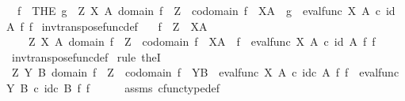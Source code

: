 \begin{isabellebody}
\ \ {\isachardoublequoteopen}f\isactrlsup {\isasymflat}\ {\isacharequal}{\kern0pt}\ {\isacharparenleft}{\kern0pt}THE\ g{\isachardot}{\kern0pt}\ {\isasymexists}\ Z\ X\ A{\isachardot}{\kern0pt}\ domain\ f\ {\isacharequal}{\kern0pt}\ Z\ {\isasymand}\ codomain\ f\ {\isacharequal}{\kern0pt}\ X\isactrlbsup A\isactrlesup \ {\isasymand}\ g\ {\isacharequal}{\kern0pt}\ {\isacharparenleft}{\kern0pt}eval{\isacharunderscore}{\kern0pt}func\ X\ A{\isacharparenright}{\kern0pt}\ {\isasymcirc}\isactrlsub c\ {\isacharparenleft}{\kern0pt}id\ A\ {\isasymtimes}\isactrlsub f\ f{\isacharparenright}{\kern0pt}{\isacharparenright}{\kern0pt}{\isachardoublequoteclose}\isanewline
\isanewline
{}\isamarkupfalse%
\ inv{\isacharunderscore}{\kern0pt}transpose{\isacharunderscore}{\kern0pt}func{\isacharunderscore}{\kern0pt}def{}{\isacharcolon}{\kern0pt}\isanewline
\ \ \ {\isachardoublequoteopen}f\ {\isacharcolon}{\kern0pt}\ Z\ {\isasymrightarrow}\ X\isactrlbsup A\isactrlesup {\isachardoublequoteclose}\isanewline
\ \ \ {\isachardoublequoteopen}{\isasymexists}\ Z\ X\ A{\isachardot}{\kern0pt}\ domain\ f\ {\isacharequal}{\kern0pt}\ Z\ {\isasymand}\ codomain\ f\ {\isacharequal}{\kern0pt}\ X\isactrlbsup A\isactrlesup \ {\isasymand}\ f\isactrlsup {\isasymflat}\ {\isacharequal}{\kern0pt}\ {\isacharparenleft}{\kern0pt}eval{\isacharunderscore}{\kern0pt}func\ X\ A{\isacharparenright}{\kern0pt}\ {\isasymcirc}\isactrlsub c\ {\isacharparenleft}{\kern0pt}id\ A\ {\isasymtimes}\isactrlsub f\ f{\isacharparenright}{\kern0pt}{\isachardoublequoteclose}\isanewline
%
\isadelimproof
\ \ %
\endisadelimproof
%
\isatagproof
{}\isamarkupfalse%
\ inv{\isacharunderscore}{\kern0pt}transpose{\isacharunderscore}{\kern0pt}func{\isacharunderscore}{\kern0pt}def\isanewline
{}\isamarkupfalse%
\ {\isacharparenleft}{\kern0pt}rule\ theI{\isacharparenright}{\kern0pt}\isanewline
\ \ \isamarkupfalse%
\ {\isachardoublequoteopen}{\isasymexists}Z\ Y\ B{\isachardot}{\kern0pt}\ domain\ f\ {\isacharequal}{\kern0pt}\ Z\ {\isasymand}\ codomain\ f\ {\isacharequal}{\kern0pt}\ Y\isactrlbsup B\isactrlesup \ {\isasymand}\ eval{\isacharunderscore}{\kern0pt}func\ X\ A\ {\isasymcirc}\isactrlsub c\ id\isactrlsub c\ A\ {\isasymtimes}\isactrlsub f\ f\ {\isacharequal}{\kern0pt}\ eval{\isacharunderscore}{\kern0pt}func\ Y\ B\ {\isasymcirc}\isactrlsub c\ id\isactrlsub c\ B\ {\isasymtimes}\isactrlsub f\ f{\isachardoublequoteclose}\isanewline
\ \ \ \ \isamarkupfalse%
\ assms\ cfunc{\isacharunderscore}{\kern0pt}type{\isacharunderscore}{\kern0pt}def\ \isamarkupfalse%

\end{isabellebody}

